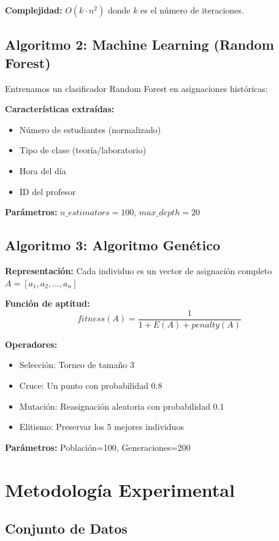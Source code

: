 \documentclass[12pt,a4paper]{article}
\begin{document}
\textbf{Complejidad:} $O(k \cdot n^2)$ donde $k$ es el número de iteraciones.

\subsection{Algoritmo 2: Machine Learning (Random Forest)}

Entrenamos un clasificador Random Forest en asignaciones históricas:

\textbf{Características extraídas:}
\begin{itemize}
\item Número de estudiantes (normalizado)
\item Tipo de clase (teoría/laboratorio)
\item Hora del día
\item ID del profesor
\end{itemize}

\textbf{Parámetros:} $n\_estimators=100$, $max\_depth=20$

\subsection{Algoritmo 3: Algoritmo Genético}

\textbf{Representación:} Cada individuo es un vector de asignación completo $A = [a_1, a_2, \ldots, a_n]$

\textbf{Función de aptitud:}
\begin{equation}
fitness(A) = \frac{1}{1 + E(A) + penalty(A)}
\end{equation}

\textbf{Operadores:}
\begin{itemize}
\item Selección: Torneo de tamaño 3
\item Cruce: Un punto con probabilidad 0.8
\item Mutación: Reasignación aleatoria con probabilidad 0.1
\item Elitismo: Preservar los 5 mejores individuos
\end{itemize}

\textbf{Parámetros:} Población=100, Generaciones=200

\section{Metodología Experimental}

\subsection{Conjunto de Datos}
\end{document}
